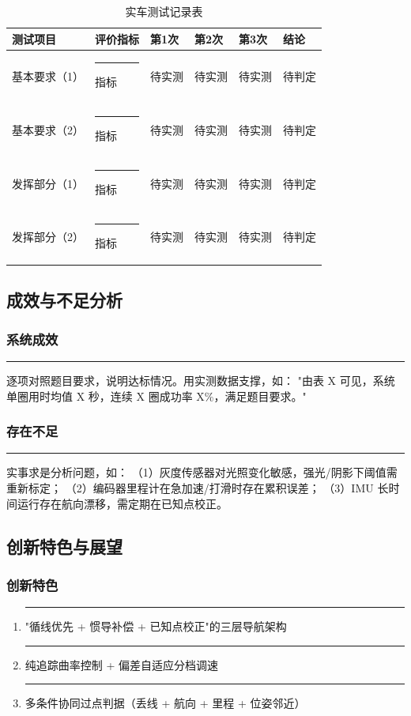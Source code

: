 \documentclass[12pt,a4paper,fontset=fandol]{ctexart}
\newcommand{\blank}{\rule{4cm}{0.4pt}}   %
\begin{document}
\begin{table}[H]
\centering
\caption{实车测试记录表}
\small
\begin{tabularx}{\textwidth}{p{2.3cm}Yp{1.15cm}p{1.15cm}p{1.15cm}p{1.35cm}}
\toprule
测试项目 & 评价指标 & 第1次 & 第2次 & 第3次 & 结论\\
\midrule
基本要求（1）& \blank{指标} & 待实测 & 待实测 & 待实测 & 待判定\\
基本要求（2）& \blank{指标} & 待实测 & 待实测 & 待实测 & 待判定\\
发挥部分（1）& \blank{指标} & 待实测 & 待实测 & 待实测 & 待判定\\
发挥部分（2）& \blank{指标} & 待实测 & 待实测 & 待实测 & 待判定\\
\bottomrule
\end{tabularx}
\end{table}

\subsection{成效与不足分析}
\subsubsection*{系统成效}
\blank{逐项对照题目要求，说明达标情况。用实测数据支撑，如：
"由表 X 可见，系统单圈用时均值 X 秒，连续 X 圈成功率 X\%，满足题目要求。"}

\subsubsection*{存在不足}
\blank{实事求是分析问题，如：
（1）灰度传感器对光照变化敏感，强光/阴影下阈值需重新标定；
（2）编码器里程计在急加速/打滑时存在累积误差；
（3）IMU 长时间运行存在航向漂移，需定期在已知点校正。}

\subsection{创新特色与展望}
\subsubsection*{创新特色}
\begin{enumerate}
  \item \blank{"循线优先 + 惯导补偿 + 已知点校正"的三层导航架构}
  \item \blank{纯追踪曲率控制 + 偏差自适应分档调速}
  \item \blank{多条件协同过点判据（丢线 + 航向 + 里程 + 位姿邻近）}
\end{enumerate}
\end{document}
